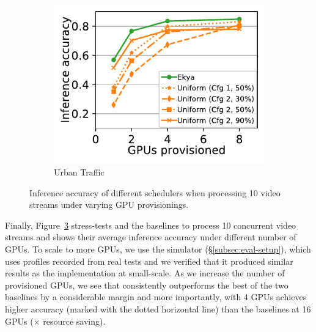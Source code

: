 \begin{figure}
\begin{subfigure}[t]{0.47\linewidth}
    \label{fig:scalability-gpus-lasvegas-golden}
  \end{subfigure}
  ~~~
  \begin{subfigure}[t]{0.47\linewidth}
    \centering
    \includegraphics[width=\linewidth]{ekya/results/multicam/bellevue_10cam_scheduler_comparison_across_resources.pdf} 
    \caption{Urban Traffic}
    \label{fig:scalability-gpus-bellevue-golden}
  \end{subfigure}
  \caption{Inference accuracy of different schedulers when processing 10 video streams under varying GPU provisionings.
  }
  \label{fig:scalability-gpus}
\end{figure}


Finally, Figure~\ref{fig:scalability-gpus} stress-tests \name and the \fair baselines to process 10 concurrent video streams and shows their average inference accuracy under different number of GPUs. 
To scale to more GPUs, we use the simulator (\S\ref{subsec:eval-setup}), which uses profiles recorded from real tests and we verified that it produced similar results as the implementation at small-scale.
As we increase the number of provisioned GPUs, we see that \name consistently outperforms the best of the two baselines by a considerable margin and more importantly, with 4 GPUs \name achieves higher accuracy (marked with the dotted horizontal line) than the baselines at 16 GPUs ($\times$ resource saving).


